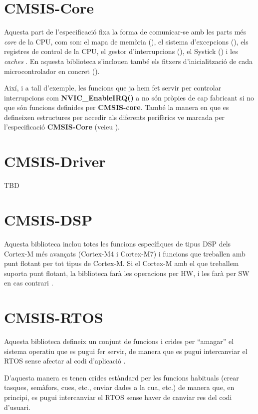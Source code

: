 \section{CMSIS-Core}
\label{sec:CMSIS-Core}
Aquesta part de l'especificació fixa la forma de comunicar-se amb les parts més {\em core} de la CPU, com son: el mapa de memòria (), el sistema d'excepcions (), els registres de control de la CPU, el gestor d'interrupcions (), el Systick () i les {\em caches} \cite{CMSIS-CORE}. En aquesta biblioteca s'inclouen també els fitxers d'inicialització de cada microcontrolador en concret ().

Així, i a tall d'exemple, les funcions que ja hem fet servir per controlar interrupcions com {\bf NVIC\_EnableIRQ()} a  no són pròpies de cap fabricant si no que són funcions definides per {\bf CMSIS-core}. També la manera en que es defineixen estructures per accedir als diferents perifèrics ve marcada per l'especificació {\bf CMSIS-Core} (veieu ).

\section{CMSIS-Driver}
TBD

\section{CMSIS-DSP}
\label{sec:CMSIS-DSP}
Aquesta biblioteca inclou totes les funcions específiques de tipus \gls{DSP} dels Cortex-M més avançats (Cortex-M4 i Cortex-M7) i funcions que treballen amb punt flotant per tot tipus de Cortex-M. Si el Cortex-M amb el que treballem suporta punt flotant, la biblioteca farà les operacions per HW, i les farà per SW en cas contrari \cite{CMSIS-DSP}\cite{AN0051}.

\section{CMSIS-RTOS}
\label{sec:CMSIS-RTOS}
Aquesta biblioteca defineix un conjunt de funcions i crides per ``amagar'' el sistema operatiu que es pugui fer servir, de manera que es pugui intercanviar el \gls{RTOS} sense afectar al codi d'aplicació \cite{CMSIS-RTOS}.

D'aquesta manera es tenen crides estàndard per les funcions habituals (crear tasques, semàfors, cues, etc., enviar dades a la cua, etc.) de manera que, en principi, es pugui intercanviar el RTOS sense haver de canviar res del codi d'usuari.

